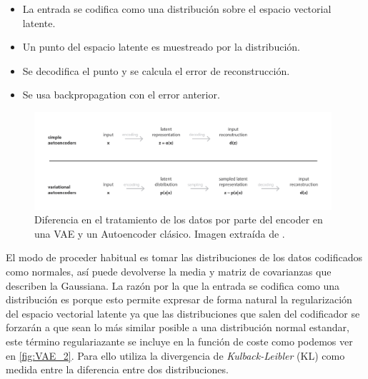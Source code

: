            \begin{itemize}
                \item La entrada se codifica como una distribución sobre el espacio vectorial latente.
                \item Un punto del espacio latente es muestreado por la distribución. 
                \item Se decodifica el punto y se calcula el error de reconstrucción.
                \item Se usa backpropagation con el error anterior.
            \end{itemize}

            \begin{figure}[!h]
                \centering
                \includegraphics[width=0.98\textwidth]{img/vae_1.png}
                \caption{Diferencia en el tratamiento de los datos por parte del encoder en una VAE y un Autoencoder clásico. Imagen extraída de \cite{VAE}.}
                \label{fig:VAE_1}
            \end{figure}

            \noindent El modo de proceder habitual es tomar las distribuciones de los datos codificados como normales, así puede devolverse la media y matriz de covarianzas que describen la Gaussiana. La razón por la que la entrada se codifica como una distribución es porque esto permite expresar de forma natural la regularización del espacio vectorial latente ya que las distribuciones que salen del codificador se forzarán a que sean lo más similar posible a una distribución normal estandar, este término regulariazante se incluye en la función de coste como podemos ver en \autoref{fig:VAE_2}. Para ello utiliza la divergencia de \textit{Kulback-Leibler} (KL) como medida entre la diferencia entre dos distribuciones.

